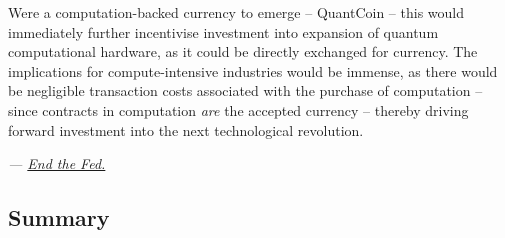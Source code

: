 Were a computation-backed currency to emerge -- QuantCoin\texttrademark{} -- this would immediately further incentivise investment into expansion of quantum computational hardware, as it could be directly exchanged for currency. The implications for compute-intensive industries would be immense, as there would be negligible transaction costs associated with the purchase of computation -- since contracts in computation \textit{are} the accepted currency -- thereby driving forward investment into the next technological revolution.

\textit{--- \href{https://www.youtube.com/watch?v=lhyaiOZhpSg}{End the Fed.}}

%
%

\subsection{Summary}

\renewcommand{\tablename}{TABLE}
\renewcommand{\arraystretch}{0.5}

